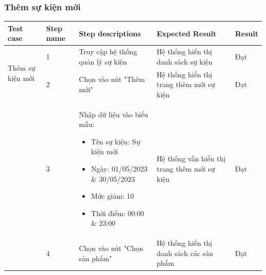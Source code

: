\subsubsection{Thêm sự kiện mới}
{
    \setlength\extrarowheight{6pt}
    \begin{longtable}{| p{2.5cm}| p{1cm}| p{5.5cm}| p{4.5cm} | p{1.5cm} |}
        \hline
        \textbf{Test case}                           & \textbf{Step name}                           & \textbf{Step descriptions}                                & \textbf{Expected Result}                                             & \textbf{Result} \\
        \hline
        \multirow[t]{2}{2.5cm}{Thêm sự kiện mới}     & 1                                            & Truy cập hệ thống quản lý sự kiện                         & Hệ thống hiển thị danh sách sự kiện                                  & Đạt             \\
        \cline{2-5}
                                                     & 2                                            & Chọn vào nút "Thêm mới"                                   & Hệ thống hiển thị trang thêm mới sự kiện                             & Đạt             \\
        \cline{2-5}
                                                     & 3                                            & Nhập dữ liệu vào biểu mẫu:
        \begin{itemize}
            \item Tên sự kiện: Sự kiện mới
            \item Ngày: 01/05/2023 \& 30/05/2023
            \item Mức giảm: 10
            \item Thời điểm: 00:00 \& 23:00
        \end{itemize}         & Hệ thống vẫn hiển thị trang thêm mới sự kiện & Đạt                                                                                                                                                                       \\
        \cline{2-5}
                                                     & 4                                            & Chọn vào nút "Chọn sản phẩm"                              & Hệ thống hiển thị danh sách các sản phẩm                             & Đạt             \\
        \cline{2-5}

\end{longtable}}
